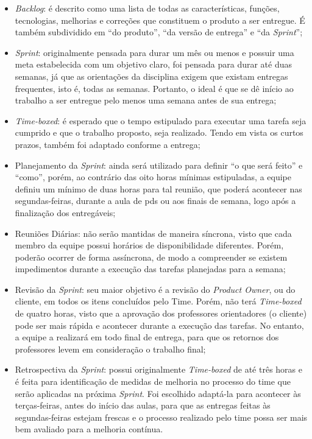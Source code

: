 \begin{itemize}
\item \textsl{Backlog}: é descrito como uma lista de todas as características, funções, tecnologias, melhorias e correções que constituem o produto a ser entregue. É também subdividido em ``do produto'', ``da versão de entrega'' e ``da \textsl{Sprint}'';

\item \textsl{Sprint}: originalmente pensada para durar um mês ou menos e possuir uma meta estabelecida com um objetivo claro, foi pensada 
para durar até duas semanas, já que as orientações da disciplina exigem que existam entregas frequentes, isto é, todas as semanas. Portanto, o ideal é que se dê início ao trabalho a ser entregue pelo menos uma semana antes de sua entrega;

\item \textsl{Time-boxed}: é esperado que o tempo estipulado para executar uma tarefa seja cumprido e que o trabalho proposto, seja realizado. Tendo em vista os curtos prazos,
também foi adaptado conforme a entrega;

\item Planejamento da \textsl{Sprint}: ainda será utilizado para definir ``o que será feito'' e ``como'', porém, ao contrário das oito horas mínimas 
estipuladas, a equipe definiu um mínimo de duas horas para tal reunião, que poderá acontecer nas segundas-feiras, durante a aula de \acs{pds} ou aos finais de semana, logo após a finalização dos entregáveis;

\item Reuniões Diárias: não serão mantidas de maneira síncrona, visto que cada membro da equipe possui horários de disponibilidade diferentes. Porém, poderão ocorrer de forma assíncrona, de modo a compreender se existem impedimentos durante a execução das tarefas planejadas para a semana;

\item Revisão da \textsl{Sprint}: seu maior objetivo é a revisão do \textsl{Product Owner}, ou do cliente, em todos os itens concluídos pelo Time. Porém, 
não terá \textsl{Time-boxed} de quatro horas, visto que a aprovação dos professores orientadores (o cliente) pode ser mais rápida e acontecer durante a execução das tarefas. No entanto, a equipe a realizará em todo final de entrega, para que os retornos dos professores levem em consideração o trabalho final;

\item Retrospectiva da \textsl{Sprint}: possui originalmente \textsl{Time-boxed} de até três horas e é feita para identificação 
de medidas de melhoria no processo do time que serão aplicadas na próxima \textsl{Sprint}. Foi escolhido adaptá-la para acontecer às terças-feiras, antes do início das aulas, para que as entregas feitas às segundas-feiras estejam frescas e o processo realizado pelo time possa ser mais bem avaliado para a melhoria contínua.
\end{itemize}

